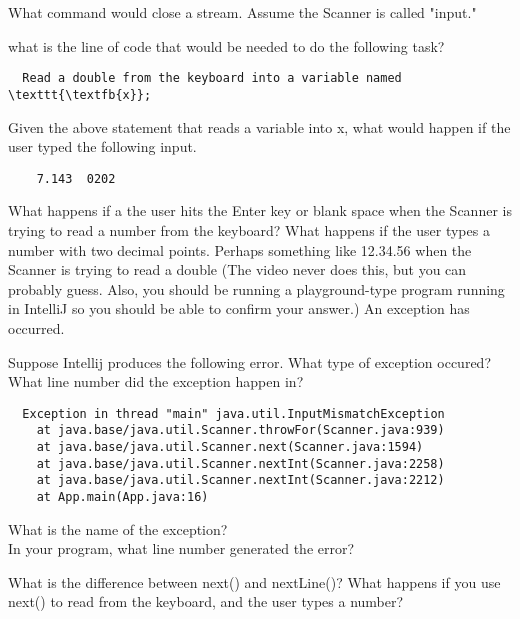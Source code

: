 \documentclass[letterpaper,11pt]{exam}
\begin{document}
\begin{questions}
\question What command would close a stream.  Assume the Scanner is called "input."
\begin{samepage}
\question what is the line of code that would be needed to do the following task?
\begin{verbatim}
  Read a double from the keyboard into a variable named \texttt{\textfb{x}};
\end{verbatim}
\end{samepage}
\begin{samepage}
\question Given the above statement that reads a variable into x, what would happen if the user typed the following input.  
\begin{verbatim}
    7.143  0202
\end{verbatim}
\end{samepage}
\question What happens if a the user hits the Enter key or blank space when the Scanner is trying to read a number from the keyboard?
\question What happens if the user types a number with two decimal points.  Perhaps something like 12.34.56 when the Scanner is trying to read a double (The video never does this, but you can probably guess.  Also, you should be running a playground-type program running in IntelliJ so you should be able to confirm your answer.)
\question An exception has occurred.  
\begin{samepage}
\question Suppose Intellij produces the following error.  What type of exception occured?  What line number did the exception happen in?
\begin{verbatim}
  Exception in thread "main" java.util.InputMismatchException
	at java.base/java.util.Scanner.throwFor(Scanner.java:939)
	at java.base/java.util.Scanner.next(Scanner.java:1594)
	at java.base/java.util.Scanner.nextInt(Scanner.java:2258)
	at java.base/java.util.Scanner.nextInt(Scanner.java:2212)
	at App.main(App.java:16)
\end{verbatim}
  What is the name of the exception?\\
  In your program, what line number generated the error?
\end{samepage}
\question What is the difference between next() and nextLine()?
\vspace{1cm}
\question What happens if you use next() to read from the keyboard, and the user types a number?


\end{questions}
\end{document}
